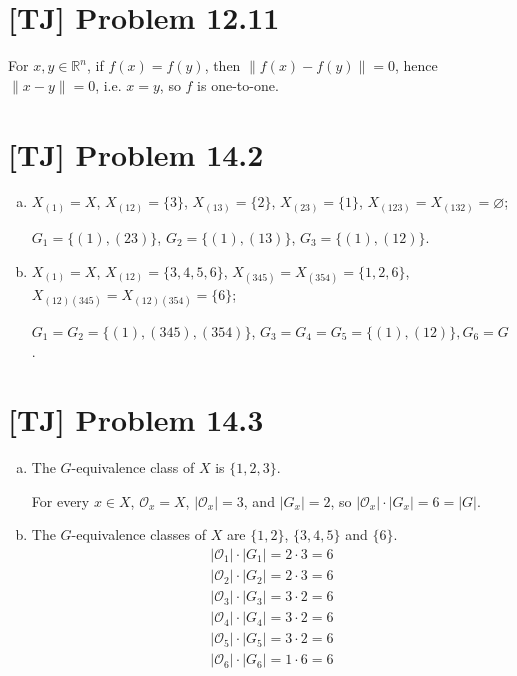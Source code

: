 \documentclass[a4paper,11pt,twocolumn]{article}
\begin{document}
  \section{[TJ] Problem 12.11}
  For $x, y \in \mathbb{R}^n$, if $f(x) = f(y)$, then $\|f(x) - f(y)\| = 0$, hence $\|x - y\| = 0$, i.e. $x = y$, so $f$ is one-to-one.

  \section{[TJ] Problem 14.2}
  \begin{enumerate}[(a)]
    \item $X_{(1)} = X$, $X_{(12)} = \{3\}$, $X_{(13)} = \{2\}$, $X_{(23)} = \{1\}$, $X_{(123)} = X_{(132)} = \varnothing$; \par
        $G_1 = \{(1), (23)\}$, $G_2 = \{(1), (13)\}$, $G_3 = \{(1), (12)\}$.
    \item $X_{(1)} = X$, $X_{(12)} = \{3, 4, 5, 6\}$, $X_{(345)} = X_{(354)}= \{1, 2, 6\}$, $X_{(12)(345)} = X_{(12)(354)} = \{6\}$; \par
        $G_1 = G_2 = \{(1), (345), (354)\}$, $G_3 = G_4 = G_5 = \{(1), (12)\}, G_6 = G$.
  \end{enumerate}

  \section{[TJ] Problem 14.3}
  \begin{enumerate}[(a)]
    \item The $G$-equivalence class of $X$ is $\{1, 2, 3\}$. \par
    For every $x \in X$, $\mathcal{O}_x = X$, $|\mathcal{O}_x| = 3$, and $|G_x| = 2$, so $|\mathcal{O}_x|\cdot|G_x|=6=|G|$.
    \item The $G$-equivalence classes of $X$ are $\{1, 2\}$, $\{3, 4, 5\}$ and $\{6\}$.
        \begin{gather*}
          |\mathcal{O}_1| \cdot |G_1| = 2 \cdot 3 = 6 \\
          |\mathcal{O}_2| \cdot |G_2| = 2 \cdot 3 = 6 \\
          |\mathcal{O}_3| \cdot |G_3| = 3 \cdot 2 = 6 \\
          |\mathcal{O}_4| \cdot |G_4| = 3 \cdot 2 = 6 \\
          |\mathcal{O}_5| \cdot |G_5| = 3 \cdot 2 = 6 \\
          |\mathcal{O}_6| \cdot |G_6| = 1 \cdot 6 = 6
        \end{gather*}
  \end{enumerate}
\end{document}

